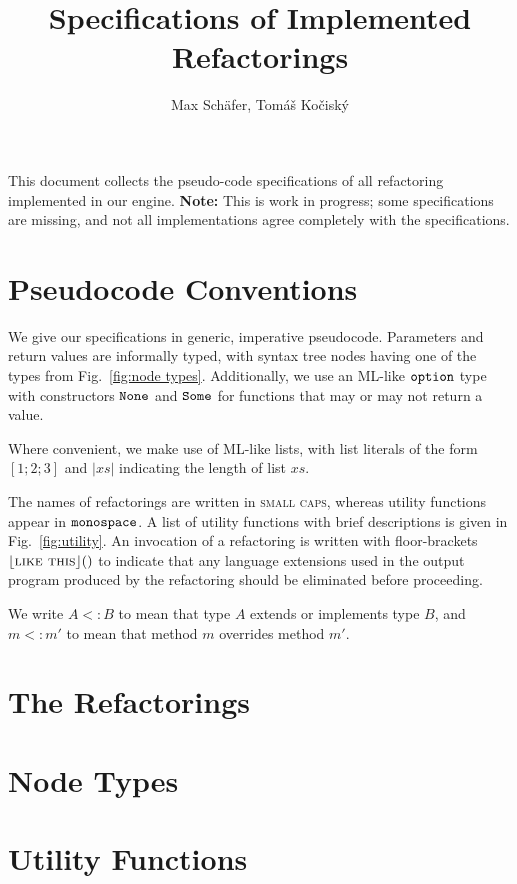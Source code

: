 \documentclass{article}
\title{Specifications of Implemented Refactorings}
\author{Max Sch\"afer, Tom\'a\v{s} Ko\v{c}isk\'y}
\newcommand{\refactoring}[1]{\textsc{#1}}
\newcommand{\refactoringNoExt}[1]{\lfloor\refactoring{#1}\rfloor}
\newcommand{\util}[1]{\ensuremath{\text{\texttt{#1}}}}
\begin{document}
\maketitle

This document collects the pseudo-code specifications of all refactoring implemented in our engine. \textbf{Note:} This is work in progress; some specifications are missing, and not all implementations agree completely with the specifications.

\section{Pseudocode Conventions}
We give our specifications in generic, imperative pseudocode. Parameters and return values are informally typed, with syntax tree nodes having one of the types from Fig.~\ref{fig:node types}. Additionally, we use an ML-like \util{option} type with constructors \util{None} and \util{Some} for functions that may or may not return a value.

Where convenient, we make use of ML-like lists, with list literals of the form $[1; 2; 3]$ and $|xs|$ indicating the length of list $xs$.

The names of refactorings are written in \refactoring{small caps}, whereas utility functions appear in \util{monospace}. A list of utility functions with brief descriptions is given in Fig.~\ref{fig:utility}. An invocation of a refactoring is written with floor-brackets $\refactoringNoExt{like this}()$ to indicate that any language extensions used in the output program produced by the refactoring should be eliminated before proceeding.

We write $A<:B$ to mean that type $A$ extends or implements type $B$, and $m<:m'$ to mean that method $m$ overrides method $m'$.

\section{The Refactorings}
























\section{Node Types}


\section{Utility Functions}


\listofalgorithms
\end{document}
